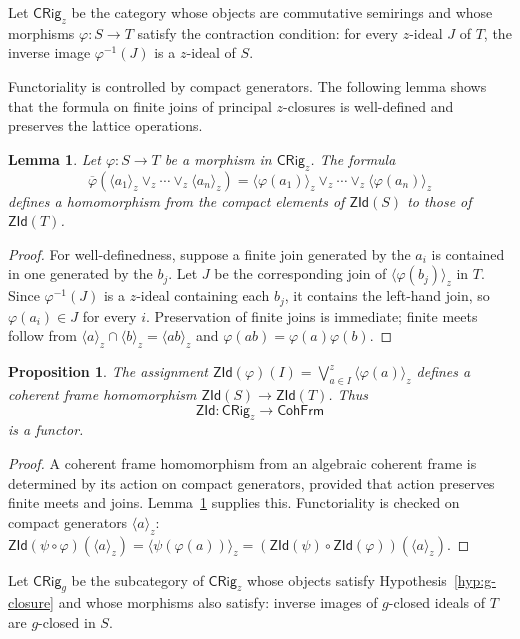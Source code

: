 \documentclass[11pt,leqno]{amsart}
\theoremstyle{plain}
\newtheorem{proposition}[theorem]{Proposition}
\newtheorem{lemma}[theorem]{Lemma}
\theoremstyle{definition}
\theoremstyle{remark}
\numberwithin{equation}{section}
\newcommand{\ZId}{\mathsf{ZId}}
\newcommand{\ideal}[1]{\langle #1\rangle}
\begin{document}
Let $\mathsf{CRig}_{z}$ be the category whose objects are commutative
semirings and whose morphisms $\varphi:S\to T$ satisfy the
contraction condition: for every $z$-ideal $J$ of $T$,
the inverse image $\varphi^{-1}(J)$ is a $z$-ideal of $S$.

Functoriality is controlled by compact generators.
The following lemma shows that the formula on finite joins of
principal $z$-closures is well-defined and preserves the
lattice operations.

\begin{lemma}\label{lem:compact-map-z}
Let $\varphi:S\to T$ be a morphism in $\mathsf{CRig}_{z}$.  The formula
\[
\overline\varphi\!\left(\ideal{a_1}_z\vee_z\cdots\vee_z\ideal{a_n}_z\right)
=\ideal{\varphi(a_1)}_z\vee_z\cdots\vee_z\ideal{\varphi(a_n)}_z
\]
defines a homomorphism from the compact elements of $\ZId(S)$ to
those of $\ZId(T)$.
\end{lemma}
\begin{proof}
For well-definedness, suppose a finite join generated by the $a_i$
is contained in one generated by the $b_j$.
Let $J$ be the corresponding join of $\ideal{\varphi(b_j)}_z$ in $T$.
Since $\varphi^{-1}(J)$ is a $z$-ideal containing each $b_j$,
it contains the left-hand join, so $\varphi(a_i)\in J$ for every $i$.
Preservation of finite joins is immediate;
finite meets follow from $\ideal{a}_z\cap\ideal{b}_z=\ideal{ab}_z$
and $\varphi(ab)=\varphi(a)\varphi(b)$.
\end{proof}

\begin{proposition}\label{loc35}
The assignment $\ZId(\varphi)(I)=\bigvee_{a\in I}^{z}
\ideal{\varphi(a)}_z$ defines a coherent frame homomorphism
$\ZId(S)\to\ZId(T)$.  Thus
\[
\ZId:\mathsf{CRig}_{z}\longrightarrow\mathsf{CohFrm}
\]
is a functor.
\end{proposition}
\begin{proof}
A coherent frame homomorphism from an algebraic coherent frame is
determined by its action on compact generators, provided that action
preserves finite meets and joins.
Lemma~\ref{lem:compact-map-z} supplies this.
Functoriality is checked on compact generators $\ideal{a}_z$:
$\ZId(\psi\circ\varphi)(\ideal{a}_z)=\ideal{\psi(\varphi(a))}_z
=(\ZId(\psi)\circ\ZId(\varphi))(\ideal{a}_z)$.
\end{proof}

Let $\mathsf{CRig}_{g}$ be the subcategory of $\mathsf{CRig}_{z}$
whose objects satisfy Hypothesis~\ref{hyp:g-closure}
and whose morphisms also satisfy:
inverse images of $g$-closed ideals of $T$ are $g$-closed in $S$.
\end{document}
